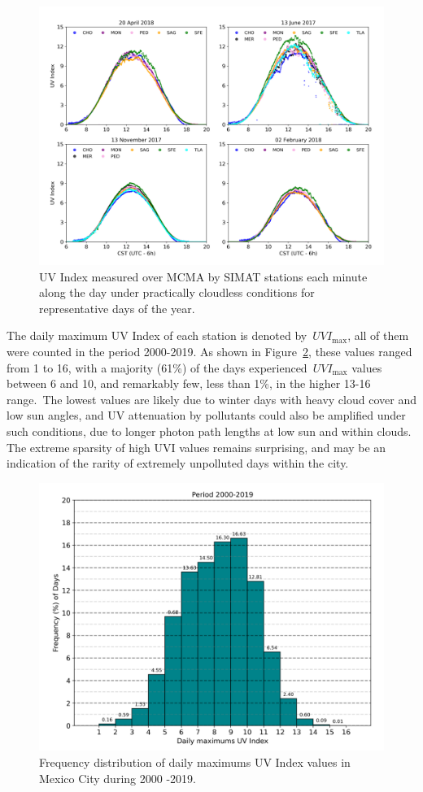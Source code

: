 \documentclass[10pt]{article}
\begin{document}
\begin{figure}[H]
  \begin{center}
    \includegraphics[width=0.70\columnwidth]{figures/season}
    \caption{{UV Index measured over MCMA by SIMAT stations each minute along the day
          under practically cloudless conditions for representative days of the
          year.
            {\label{628947}}%
        }}
  \end{center}
\end{figure}

The daily maximum UV Index of each station is denoted
by~\(UVI_{\max}\), all of them were counted in the period 2000-2019.
As shown in Figure~{\ref{461017}}, these values ranged
from 1 to 16, with a majority (61\%) of the days
experienced~\(UVI_{\max}\) values between 6 and 10, and remarkably
few, less than 1\%, in the higher 13-16 range.~The lowest values are
likely due to winter days with heavy cloud cover and low sun angles, and
UV attenuation by pollutants could also be amplified under such
conditions, due to longer photon path lengths at low sun and within
clouds. The extreme sparsity of high UVI values remains surprising, and
may be an indication of the rarity of extremely unpolluted days within
the city.
\begin{figure}[H]
  \begin{center}
    \includegraphics[width=0.49\columnwidth]{figures/Histogram}
    \caption{{Frequency distribution of daily maximums UV Index values in Mexico City
    during 2000 -2019.
    {\label{461017}}%
    }}
  \end{center}
\end{figure}
\end{document}

